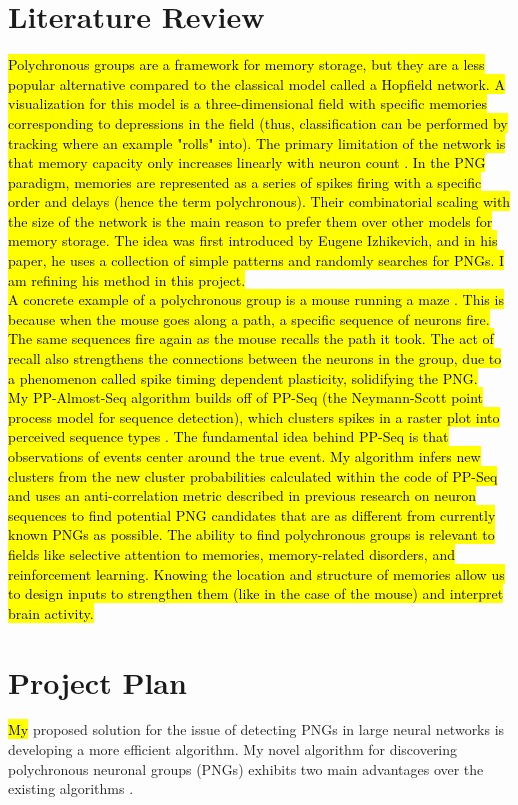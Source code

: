 \documentclass{sigchi}
\begin{document}
\section{Literature Review}
\hl{
Polychronous groups are a framework for memory storage, but they are a less popular alternative compared to the classical model called a Hopfield network. A visualization for this model is a three-dimensional field with specific memories corresponding to depressions in the field (thus, classification can be performed by tracking where an example "rolls" into). The primary limitation of the network is that memory capacity only increases linearly with neuron count {\cite{hopfield}}. In the PNG paradigm, memories are represented as a series of spikes firing with a specific order and delays (hence the term polychronous){\cite{pngalgo}}. Their combinatorial scaling with the size of the network is the main reason to prefer them over other models for memory storage. The idea was first introduced by Eugene Izhikevich, and in his paper, he uses a collection of simple patterns and randomly searches for PNGs. I am refining his method in this project.\\
A concrete example of a polychronous group is a mouse running a maze {\cite{mouse}}. This is because when the mouse goes along a path, a specific sequence of neurons fire. The same sequences fire again as the mouse recalls the path it took. The act of recall also strengthens the connections between the neurons in the group, due to a phenomenon called spike timing dependent plasticity, solidifying the PNG.\\
My PP-Almost-Seq algorithm builds off of PP-Seq (the Neymann-Scott point process model for sequence detection), which clusters spikes in a raster plot into perceived sequence types {\cite{ppseq}}. The fundamental idea behind PP-Seq is that observations of events center around the true event. My algorithm infers new clusters from the new cluster probabilities calculated within the code of PP-Seq and uses an anti-correlation metric described in previous research on neuron sequences {\cite{correlation}} to find potential PNG candidates that are as different from currently known PNGs as possible. The ability to find polychronous groups is relevant to fields like selective attention to memories, memory-related disorders, and reinforcement learning. Knowing the location and structure of memories allow us to design inputs to strengthen them (like in the case of the mouse) and interpret brain activity.}
\section{Project Plan}
\hl{My} proposed solution for the issue of detecting PNGs in large neural networks is developing a more efficient algorithm. My novel algorithm for discovering polychronous neuronal groups (PNGs) exhibits two main advantages over the existing algorithms \cite{pngalgo}.
\end{document}
